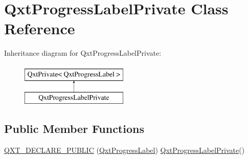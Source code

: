 \hypertarget{class_qxt_progress_label_private}{\section{Qxt\-Progress\-Label\-Private Class Reference}
\label{class_qxt_progress_label_private}
}
Inheritance diagram for Qxt\-Progress\-Label\-Private\-:\begin{figure}[H]
\begin{center}
\leavevmode
\includegraphics[height=2.000000cm]{class_qxt_progress_label_private}
\end{center}
\end{figure}
\subsection*{Public Member Functions}
\begin{DoxyCompactItemize}
\item 
\hyperlink{class_qxt_progress_label_private_a7abaf10ffbc7443b29c46e7597443739}{Q\-X\-T\-\_\-\-D\-E\-C\-L\-A\-R\-E\-\_\-\-P\-U\-B\-L\-I\-C} (\hyperlink{class_qxt_progress_label}{Qxt\-Progress\-Label}) \hyperlink{class_qxt_progress_label_private}{Qxt\-Progress\-Label\-Private}()
\end{DoxyCompactItemize}
